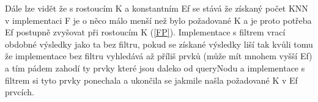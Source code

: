 \documentclass[czech,semestral,dept460,male,csharp,cpdeclaration]{diploma}
\begin{document}
		Dále lze vidět že s rostoucím K a konstantním Ef se stává že získaný počet KNN v implementaci F je o něco málo menší než bylo požadované K a je proto potřeba Ef postupně zvyšovat při rostoucím K (\ref{FP}). Implementace s filtrem vrací obdobné výsledky jako ta bez filtru, pokud se získané výsledky liší tak kvůli tomu že implementace bez filtru vyhledává až příliš prvků (může mít mnohem vyšší Ef) a tím pádem zahodí ty prvky které jsou daleko od queryNodu a implementace s filtrem si tyto prvky ponechala a ukončila se jakmile našla požadované K v Ef prvcích.
		
		\newpage
		
		\begin{center}
			
			\begin{tabular}{c c c c c c c c}\label{FBC}
				

\end{tabular}
\end{center}
\end{document}

